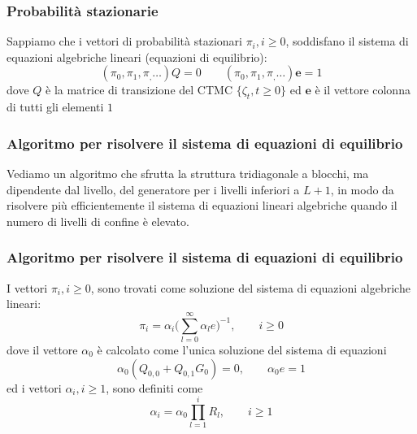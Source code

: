 \documentclass{beamer}
\begin{document}
\begin{frame}
    \frametitle{Probabilità stazionarie}
    Sappiamo che i vettori di probabilità stazionari $\pi_i, i \geq 0$, soddisfano il sistema di equazioni algebriche lineari (equazioni di equilibrio):
    $$(\pi_0, \pi_1, \pi_, \dots)Q = 0 \qquad (\pi_0, \pi_1, \pi_, \dots)\textbf{e} = 1$$
    dove $Q$ è la matrice di transizione del CTMC $\{\zeta_t, t \geq 0\}$ ed $\textbf{e}$ è il vettore colonna di tutti gli elementi $1$
\end{frame}


\begin{frame}
    \frametitle{Algoritmo per risolvere il sistema di equazioni di equilibrio}
    \begin{block}{}
            Vediamo un algoritmo che sfrutta la struttura tridiagonale a blocchi, ma dipendente dal livello, del generatore per i livelli inferiori a $L+1$, in modo da risolvere più efficientemente il sistema di equazioni lineari algebriche quando il numero di livelli di confine è elevato.
    \end{block}
\end{frame}


\begin{frame}
    \frametitle{Algoritmo per risolvere il sistema di equazioni di equilibrio}
    \begin{theorem}
        I vettori $\pi_i, i \geq 0$, sono trovati come soluzione del sistema di equazioni algebriche lineari:
        \small{\begin{equation*}
            \pi_i = \alpha_i \big( \sum_{l=0}^\infty \alpha_l e \big)^{-1}, \qquad i \geq 0
        \end{equation*}}
        dove il vettore $\alpha_0$ è calcolato come l'unica soluzione del sistema di equazioni
        \small{\begin{equation*}
            \alpha_0(Q_{0,0} + Q_{0,1}G_0) = 0, \qquad \alpha_0e = 1
        \end{equation*}}
        ed i vettori $\alpha_i, i \geq 1$, sono definiti come
        \small{\begin{equation*}
            \alpha_i = \alpha_0 \prod_{l=1}^i R_l, \qquad i \geq 1
        \end{equation*}}
    \end{theorem}
\end{frame}
\end{document}

